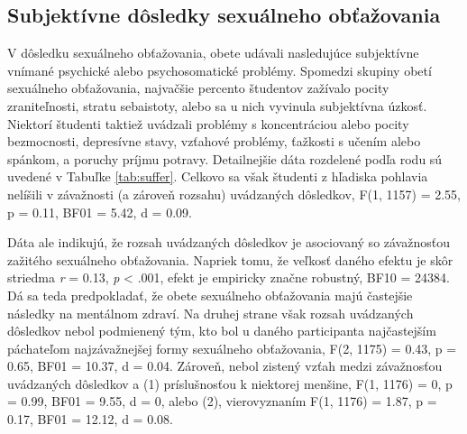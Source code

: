 \documentclass[
]{article}
\begin{document}
\begin{table}[H]

\caption{\label{tab:whereTable}Miesto sexuálneho obťažovania}
\centering
{}
\end{table}

\hypertarget{subjektuxedvne-duxf4sledky-sexuuxe1lneho-obux165aux17eovania}{%
\subsection{Subjektívne dôsledky sexuálneho obťažovania}\label{subjektuxedvne-duxf4sledky-sexuuxe1lneho-obux165aux17eovania}}

V dôsledku sexuálneho obťažovania, obete udávali nasledujúce subjektívne vnímané psychické alebo psychosomatické problémy. Spomedzi skupiny obetí sexuálneho obťažovania, najvačšie percento študentov zažívalo pocity zraniteľnosti, stratu sebaistoty, alebo sa u nich vyvinula subjektívna úzkosť. Niektorí študenti taktiež uvádzali problémy s koncentráciou alebo pocity bezmocnosti, depresívne stavy, vzťahové problémy, ťažkosti s učením alebo spánkom, a poruchy príjmu potravy. Detailnejšie dáta rozdelené podľa rodu sú uvedené v Tabuľke \ref{tab:suffer}. Celkovo sa však študenti z hľadiska pohlavia nelíšili v závažnosti (a zároveň rozsahu) uvádzaných dôsledkov, F(1, 1157) = 2.55, p = 0.11, BF01 = 5.42, d = 0.09.

Dáta ale indikujú, že rozsah uvádzaných dôsledkov je asociovaný so závažnosťou zažitého sexuálneho obťažovania. Napriek tomu, že veľkosť daného efektu je skôr striedma \emph{r} = 0.13, \emph{p} \textless{} .001, efekt je empiricky značne robustný, BF10 = 24384. Dá sa teda predpokladať, že obete sexuálneho obťažovania majú častejšie následky na mentálnom zdraví. Na druhej strane však rozsah uvádzaných dôsledkov nebol podmienený tým, kto bol u daného participanta najčastejším páchateľom najzávažnejšej formy sexuálneho obťažovania, F(2, 1175) = 0.43, p = 0.65, BF01 = 10.37, d = 0.04. Zároveň, nebol zistený vzťah medzi závažnosťou uvádzaných dôsledkov a (1) príslušnosťou k niektorej menšine, F(1, 1176) = 0, p = 0.99, BF01 = 9.55, d = 0, alebo (2), vierovyznaním F(1, 1176) = 1.87, p = 0.17, BF01 = 12.12, d = 0.08.
\end{document}
